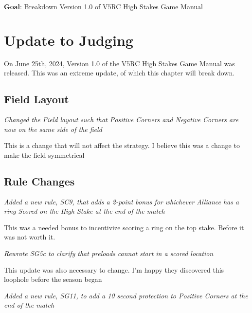 \textbf{Goal}: Breakdown Version 1.0 of V5RC High Stakes Game Manual
\section*{Update to Judging}

On June 25th, 2024, Version 1.0 of the V5RC High Stakes Game Manual was released. This was an extreme update, of which this chapter will break down.
\subsection*{Field Layout}
\textit{Changed the Field layout such that Positive Corners and Negative Corners are now on the same side of the field} 

This is a change that will not affect the strategy. I believe this was a change to make the field symmetrical 
\subsection*{Rule Changes}
\textit{Added a new rule, SC9, that adds a 2-point bonus for whichever Alliance has a ring Scored on the High Stake at the end of the match} 

This was a needed bonus to incentivize scoring a ring on the top stake. Before it was not worth it.  

\textit{Rewrote SG5c to clarify that preloads cannot start in a scored location} 

This update was also necessary to change. I'm happy they discovered this loophole before the season began 

\textit{Added a new rule, SG11, to add a 10 second protection to Positive Corners at the end of the match} 

